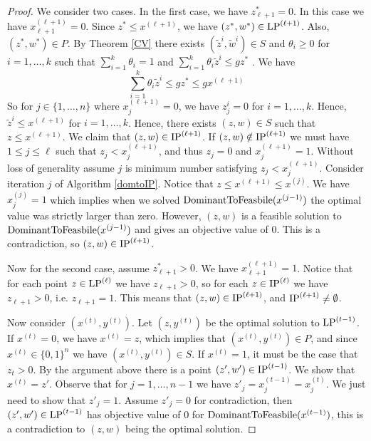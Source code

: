 \begin{proof}
  We consider two cases. In the first case, we have $z^*_{\ell+1}=0$. In this case we have $x^{(\ell+1)}_{\ell+1}=0$. Since $z^*\leq x^{(\ell+1)}$, we have $(z^*,w^*)\in \operatorname{LP}^{(\ell+1)}$. Also, $(z^*,w^*)\in P$. By Theorem \ref{CV} there exists $(\tilde{z}^i,\tilde{w}^i)\in S$ and $\theta_i\geq 0$ for $i=1,\ldots,k$ such that $\sum_{i=1}^{k} \theta_i = 1$ and  $\sum_{i=1}^{k}\theta_i \tilde{z}^i \leq gz^*$ . We have
  \begin{equation}
   \sum_{i=1}^{k}\theta_i \tilde{z}^i \leq gz^*\leq gx^{(\ell+1)}
  \end{equation}
  So for $j\in \{1,\ldots,n\}$ where $x^{(\ell+1)}_j=0$, we have $z^i_j=0$ for $i=1,\ldots,k$. Hence, $\tilde{z}^i\leq x^{(\ell+1)}$ for $i=1,\ldots,k$. Hence, there exists $(z,w)\in S$ such that $z\leq x^{(\ell+1)}$. We claim that $(z,w)\in \operatorname{IP}^{(\ell+1)}$. If $(z,w)\notin \operatorname{IP}^{(\ell+1)}$ we must have $1\leq j \leq \ell$ such that $z_j < x^{(\ell+1)}_{j}$, and thus $z_j = 0$ and $x^{(\ell+1)}_j=1$. Without loss of generality assume $j$ is minimum number satisfying $z_j < x^{(\ell+1)}_{j}$. Consider iteration $j$ of Algorithm \ref{domtoIP}. Notice that $z\leq x^{(\ell+1)}\leq x^{(j)}$. We have $x^{(j)}_j=1$ which implies when we solved $\operatorname{DominantToFeasbile}(x^{(j-1)})$ the optimal value was strictly larger than zero. However, $(z,w)$ is a feasible solution to $\operatorname{DominantToFeasbile}(x^{(j-1)})$ and gives an objective value of 0. This is a contradiction, so $(z,w)\in \operatorname{IP}^{(\ell+1)}$.
  
  Now for the second case, assume $z^*_{\ell+1} > 0$. We have $x^{(\ell+1)}_{\ell+1}=1$. Notice that for each point $z\in \operatorname{LP}^{(\ell)}$ we have $z_{\ell+1} >0$, so for each $z\in \operatorname{IP}^{(\ell)}$ we have $z_{\ell+1}>0$, i.e. $z_{\ell+1}=1$. This means that $(z,w)\in \operatorname{IP}^{(\ell+1)}$, and $\operatorname{IP}^{(\ell+1)} \neq \emptyset$.
  
  Now consider $(x^{(t)},y^{(t)})$. Let $(z,y^{(t)})$ be the optimal solution to $\operatorname{LP}^{(t-1)}$. If $x^{(t)} = 0$, we have $x^{(t)} = z$, which implies that $(x^{(t)},y^{(t)})\in P$, and since $x^{(t)}\in \{0,1\}^n$ we have $(x^{(t)},y^{(t)})\in S$. If $x^{(t)} =1$, it must be the case that $z_t > 0$. By the argument above there is a point $(z',w')\in \operatorname{IP}^{(t-1)}$. We show that $x^{(t)} = z'$. Observe that for $j=1,\ldots,n-1$ we have $z'_j= x_j^{(t-1)}=x_j^{(t)}$. We just need to show that $z'_j = 1$. Assume $z'_j = 0$ for contradiction, then $(z',w')\in \operatorname{LP}^{(t-1)}$ has objective value of $0$ for $\operatorname{DominantToFeasbile}(x^{(t-1)})$, this is a contradiction to $(z,w)$ being the optimal solution.
  \end{proof}

